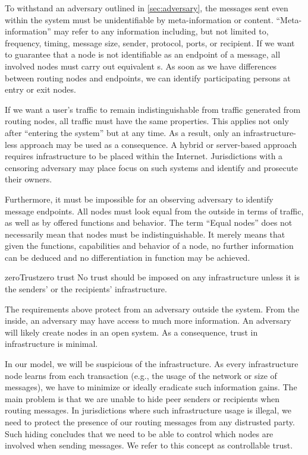 To withstand an adversary outlined in \cref{sec:adversary}, the messages sent even within the system must be unidentifiable by meta-information or content. ``Meta-information'' may refer to any information including, but not limited to, frequency, timing, message size, sender, protocol, ports, or recipient. If we want to guarantee that a node is not identifiable as an endpoint of a message, all involved nodes must carry out equivalent s. As soon as we have differences between routing nodes and endpoints, we can identify participating persons at entry or exit nodes.

If we want a user's traffic to remain indistinguishable from traffic generated from routing nodes, all traffic must have the same properties. This applies not only after ``entering the system'' but at any time. As a result, only an infrastructure-less approach may be used as a consequence. A hybrid or server-based approach requires infrastructure to be placed within the Internet. Jurisdictions with a censoring adversary may place focus on such systems and identify and prosecute their owners. 

Furthermore, it must be impossible for an observing adversary to identify message endpoints. All nodes must look equal from the outside in terms of traffic, as well as by offered functions and behavior. The term ``Equal nodes'' does not necessarily mean that nodes must be indistinguishable. It merely means that given the functions, capabilities and behavior of a node, no further information can be deduced and no differentiation in function may be achieved.

\begin{requirement}{zeroTrust}{zero trust}
	No trust should be imposed on any infrastructure unless it is the senders' or the recipients' infrastructure.
\end{requirement}    

The requirements above protect from an adversary outside the system. From the inside, an adversary may have access to much more information. An adversary will likely create nodes in an open system. As a consequence, trust in infrastructure is minimal.

In our model, we will be suspicious of the infrastructure. As every infrastructure node learns from each transaction (e.g., the usage of the network or size of messages), we have to minimize or ideally eradicate such information gains. The main problem is that we are unable to hide peer senders or recipients when routing messages. In jurisdictions where such infrastructure usage is illegal, we need to protect the presence of our routing messages from any distrusted party. Such hiding concludes that we need to be able to control which nodes are involved when sending messages. We refer to this concept as controllable trust.

